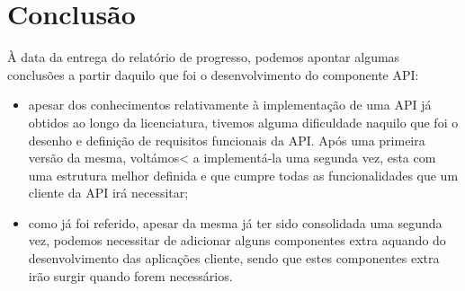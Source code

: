 \section{Conclusão}
À data da entrega do relatório de progresso, podemos apontar algumas conclusões a partir daquilo que foi o desenvolvimento do componente API:

\begin{itemize}
	\item apesar dos conhecimentos relativamente à implementação de uma API já obtidos ao longo da licenciatura, tivemos alguma dificuldade naquilo que foi o desenho e definição de requisitos funcionais da API. Após uma primeira versão da mesma, voltámos< a implementá-la uma segunda vez, esta com uma estrutura melhor definida e que cumpre todas as funcionalidades que um cliente da API irá necessitar;
	\item como já foi referido, apesar da mesma já ter sido consolidada uma segunda vez, podemos necessitar de adicionar alguns componentes extra aquando do desenvolvimento das aplicações cliente, sendo que estes componentes extra irão surgir quando forem necessários.
\end{itemize}